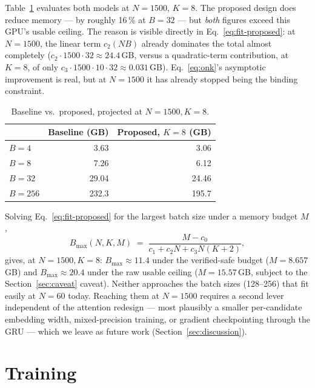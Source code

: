 \documentclass[11pt]{article}
\begin{document}
Table~\ref{tab:projection} evaluates both models at $N{=}1500$, $K{=}8$.
The proposed design does reduce memory --- by roughly 16\,\% at $B{=}32$ ---
but \emph{both} figures exceed this GPU's usable ceiling. The reason is
visible directly in Eq.~\eqref{eq:fit-proposed}: at $N{=}1500$, the linear
term $c_2(NB)$ already dominates the total almost completely
($c_2 \cdot 1500 \cdot 32 \approx 24.4$\,GB, versus a quadratic-term
contribution, at $K{=}8$, of only $c_3\cdot1500\cdot10\cdot32\approx
0.031$\,GB). Eq.~\eqref{eq:onk}'s asymptotic improvement is real, but at
$N{=}1500$ it has already stopped being the binding constraint.

\begin{table}[h!]
\centering
\caption{Baseline vs.\ proposed, projected at $N{=}1500,K{=}8$.}
\label{tab:projection}
\begin{tabular}{@{}lrr@{}}
\toprule
 & Baseline (GB) & Proposed, $K{=}8$ (GB) \\
\midrule
$B=4$   & 3.63  & 3.06 \\
$B=8$   & 7.26  & 6.12 \\
$B=32$  & 29.04 & 24.46 \\
$B=256$ & 232.3 & 195.7 \\
\bottomrule
\end{tabular}
\end{table}

Solving Eq.~\eqref{eq:fit-proposed} for the largest batch size under a
memory budget $M$,
\begin{equation}
  B_{\max}(N,K,M) \;=\; \frac{M - c_0}{c_1 + c_2 N + c_3 N(K+2)},
  \label{eq:bmax}
\end{equation}
gives, at $N{=}1500,K{=}8$: $B_{\max}\approx11.4$ under the verified-safe
budget ($M{=}8.657$\,GB) and $B_{\max}\approx20.4$ under the raw usable
ceiling ($M{=}15.57$\,GB, subject to the Section~\ref{sec:caveat} caveat).
Neither approaches the batch sizes (128--256) that fit easily at $N{=}60$
today. Reaching them at $N{=}1500$ requires a second lever independent of
the attention redesign --- most plausibly a smaller per-candidate embedding
width, mixed-precision training, or gradient checkpointing through the GRU
--- which we leave as future work (Section~\ref{sec:discussion}).

\section{Training}
\label{sec:training}
\end{document}
